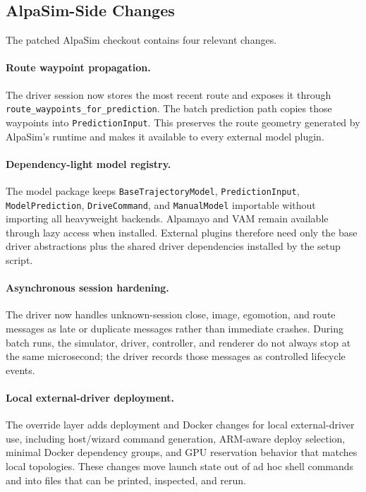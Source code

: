 \documentclass{article}
\begin{document}
\subsection{AlpaSim-Side Changes}

The patched AlpaSim checkout contains four relevant changes.

\paragraph{Route waypoint propagation.}
The driver session now stores the most recent route and exposes it through
\texttt{route\_waypoints\_for\_prediction}. The batch prediction path copies those
waypoints into \texttt{PredictionInput}. This preserves the route geometry generated by
AlpaSim's runtime and makes it available to every external model plugin.

\paragraph{Dependency-light model registry.}
The model package keeps \texttt{BaseTrajectoryModel}, \texttt{PredictionInput},
\texttt{ModelPrediction}, \texttt{DriveCommand}, and \texttt{ManualModel} importable
without importing all heavyweight backends. Alpamayo and VAM remain available through
lazy access when installed. External plugins therefore need only the base driver
abstractions plus the shared driver dependencies installed by the setup script.

\paragraph{Asynchronous session hardening.}
The driver now handles unknown-session close, image, egomotion, and route messages as
late or duplicate messages rather than immediate crashes. During batch runs, the
simulator, driver, controller, and renderer do not always stop at the same microsecond;
the driver records those messages as controlled lifecycle events.

\paragraph{Local external-driver deployment.}
The override layer adds deployment and Docker changes for local external-driver use,
including host/wizard command generation, ARM-aware deploy selection, minimal Docker
dependency groups, and GPU reservation behavior that matches local topologies. These
changes move launch state out of ad hoc shell commands and into files that can be
printed, inspected, and rerun.
\end{document}
